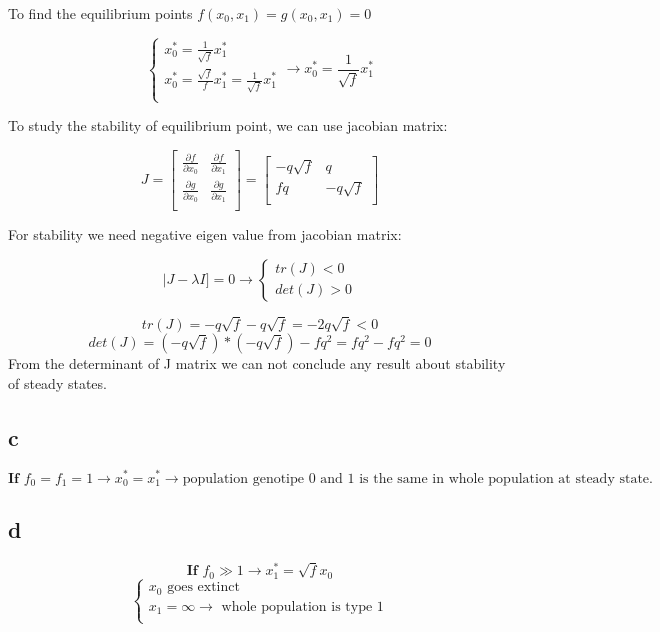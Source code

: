 To find the equilibrium points $f(x_0, x_1) = g(x_0, x_1) = 0$ 

\[\left\{ \begin{array}{l}
         x^*_0 = \frac{1}{\sqrt{f}}x^*_1\\
         x^*_0 = \frac{\sqrt{f}}{f}x^*_1 = \frac{1}{\sqrt{f}}x^*_1\\
       \end{array} \right. \rightarrow x^*_0 = \frac{1}{\sqrt{f}}x^*_1 \]
       
To study the  stability of equilibrium point, we can use jacobian matrix:

\[ J = \begin{bmatrix}
       \frac{\partial f}{\partial x_0} & \frac{\partial f}{\partial x_1} \\[0.8em]
       \frac{\partial g}{\partial x_0} & \frac{\partial g}{\partial x_1}\\[0.8em]
     \end{bmatrix} = \begin{bmatrix}
            -q\sqrt{f} & q \\[0.3em]
            fq & -q\sqrt{f}\\[0.3em]
          \end{bmatrix} 
\]

For stability we need negative eigen value from jacobian matrix:

\[ |J-\lambda I] = 0 \rightarrow \left\{ \begin{array}{l} tr(J) < 0 \\ det(J) > 0 \end{array} \right. \]

\[ tr(J) = -q\sqrt{f} -q\sqrt{f} = -2q\sqrt{f} < 0 \]
\[ det(J) = (-q\sqrt{f})*(-q\sqrt{f}) -fq^2 = fq^2 -fq^2 = 0 \]
From the determinant of J matrix we can not conclude any result about stability of steady states.

\subsection{c}

\[ \textbf{If } f_0 = f_1 = 1 \rightarrow x^*_0 = x^*_1 \rightarrow \text{population genotipe 0 and 1 is the same in whole population at steady state.}  \]

\subsection{d}

\[ \textbf{If } f_0 \gg 1 \rightarrow x^*_1 = \sqrt{f}x_0 \]
\[ \left\{ \begin{array}{l}
         x_0 \text{ goes extinct}\\
         x_1 = \infty \rightarrow \text{ whole population is type 1}\\
       \end{array} \right. \]
